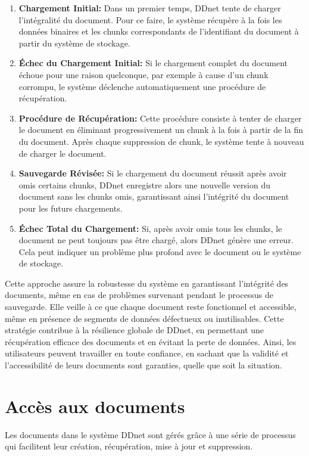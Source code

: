 \begin{enumerate}
  \item \textbf{Chargement Initial:} Dans un premier temps, DDnet tente de charger l'intégralité du document. Pour ce faire, le système récupère à la fois les données binaires et les chunks correspondants de l'identifiant du document à partir du système de stockage.
  \item \textbf{Échec du Chargement Initial:} Si le chargement complet du document échoue pour une raison quelconque, par exemple à cause d'un chunk corrompu, le système déclenche automatiquement une procédure de récupération.
  \item \textbf{Procédure de Récupération:} Cette procédure consiste à tenter de charger le document en éliminant progressivement un chunk à la fois à partir de la fin du document. Après chaque suppression de chunk, le système tente à nouveau de charger le document.
  \item \textbf{Sauvegarde Révisée:} Si le chargement du document réussit après avoir omis certains chunks, DDnet enregistre alors une nouvelle version du document sans les chunks omis, garantissant ainsi l'intégrité du document pour les futurs chargements.
  \item \textbf{Échec Total du Chargement:} Si, après avoir omis tous les chunks, le document ne peut toujours pas être chargé, alors DDnet génère une erreur. Cela peut indiquer un problème plus profond avec le document ou le système de stockage.
\end{enumerate}

Cette approche assure la robustesse du système en garantissant l'intégrité des documents, même en cas de problèmes survenant pendant le processus de sauvegarde. Elle veille à ce que chaque document reste fonctionnel et accessible, même en présence de segments de données défectueux ou inutilisables. Cette stratégie contribue à la résilience globale de DDnet, en permettant une récupération efficace des documents et en évitant la perte de données. Ainsi, les utilisateurs peuvent travailler en toute confiance, en sachant que la validité et l'accessibilité de leurs documents sont garanties, quelle que soit la situation.

\section{Accès aux documents}

Les documents dans le système DDnet sont gérés grâce à une série de processus qui facilitent leur création, récupération, mise à jour et suppression.

